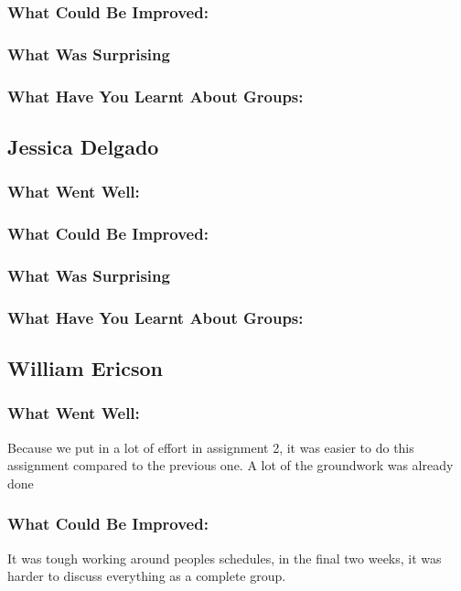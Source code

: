 \documentclass[11pt, oneside, a4paper, titlepage]{article}
\begin{document}
\subsubsection{What Could Be Improved:}


\subsubsection{What Was Surprising}


\subsubsection{What Have You Learnt About Groups:}


\subsection{Jessica Delgado}
\subsubsection{What Went Well:}


\subsubsection{What Could Be Improved:}


\subsubsection{What Was Surprising}


\subsubsection{What Have You Learnt About Groups:}


\subsection{William Ericson}
\subsubsection{What Went Well:}
Because we put in a lot of effort in assignment 2, it was easier to do this assignment compared to the previous one. A lot of the groundwork was already done 

\subsubsection{What Could Be Improved:}
It was tough working around peoples schedules, in the final two weeks, it was harder to discuss everything as a complete group. 
\end{document}
